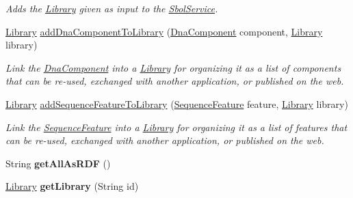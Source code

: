 \begin{DoxyCompactItemize}
\begin{DoxyCompactList}\small\item\em Adds the \hyperlink{classorg_1_1sbolstandard_1_1lib_s_b_o_lj_1_1_library}{Library} given as input to the \hyperlink{classorg_1_1sbolstandard_1_1lib_s_b_o_lj_1_1_sbol_service}{SbolService}. \item\end{DoxyCompactList}\item 
\hyperlink{classorg_1_1sbolstandard_1_1lib_s_b_o_lj_1_1_library}{Library} \hyperlink{classorg_1_1sbolstandard_1_1lib_s_b_o_lj_1_1_sbol_service_a0f8d861cd85028c6a67c6480dc87d15e}{addDnaComponentToLibrary} (\hyperlink{classorg_1_1sbolstandard_1_1lib_s_b_o_lj_1_1_dna_component}{DnaComponent} component, \hyperlink{classorg_1_1sbolstandard_1_1lib_s_b_o_lj_1_1_library}{Library} library)
\begin{DoxyCompactList}\small\item\em Link the \hyperlink{classorg_1_1sbolstandard_1_1lib_s_b_o_lj_1_1_dna_component}{DnaComponent} into a \hyperlink{classorg_1_1sbolstandard_1_1lib_s_b_o_lj_1_1_library}{Library} for organizing it as a list of components that can be re-\/used, exchanged with another application, or published on the web. \item\end{DoxyCompactList}\item 
\hyperlink{classorg_1_1sbolstandard_1_1lib_s_b_o_lj_1_1_library}{Library} \hyperlink{classorg_1_1sbolstandard_1_1lib_s_b_o_lj_1_1_sbol_service_ae387ca46de01accf2c313559d3783d1c}{addSequenceFeatureToLibrary} (\hyperlink{classorg_1_1sbolstandard_1_1lib_s_b_o_lj_1_1_sequence_feature}{SequenceFeature} feature, \hyperlink{classorg_1_1sbolstandard_1_1lib_s_b_o_lj_1_1_library}{Library} library)
\begin{DoxyCompactList}\small\item\em Link the \hyperlink{classorg_1_1sbolstandard_1_1lib_s_b_o_lj_1_1_sequence_feature}{SequenceFeature} into a \hyperlink{classorg_1_1sbolstandard_1_1lib_s_b_o_lj_1_1_library}{Library} for organizing it as a list of features that can be re-\/used, exchanged with another application, or published on the web. \item\end{DoxyCompactList}\item 
\hypertarget{classorg_1_1sbolstandard_1_1lib_s_b_o_lj_1_1_sbol_service_aa526fee3a3bac11771438a28b4fd47ea}{
String {\bfseries getAllAsRDF} ()}
\label{classorg_1_1sbolstandard_1_1lib_s_b_o_lj_1_1_sbol_service_aa526fee3a3bac11771438a28b4fd47ea}

\item 
\hypertarget{classorg_1_1sbolstandard_1_1lib_s_b_o_lj_1_1_sbol_service_ae514a61ce2bda5351f853390e77afab5}{
\hyperlink{classorg_1_1sbolstandard_1_1lib_s_b_o_lj_1_1_library}{Library} {\bfseries getLibrary} (String id)}
\label{classorg_1_1sbolstandard_1_1lib_s_b_o_lj_1_1_sbol_service_ae514a61ce2bda5351f853390e77afab5}

\end{DoxyCompactItemize}


